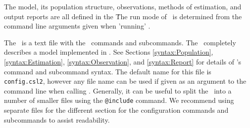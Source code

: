 The model, its population structure, observations, methods of estimation, and output reports are all defined in the \config\. The run mode of \CNAME\ is determined from the command line arguments given when 'running' \CNAME. 

The \config\ is a text file with the \CNAME\ commands and subcommands. The \config\ completely describes a model implemented in \CNAME. See Sections \ref{syntax:Population}, \ref{syntax:Estimation}, \ref{syntax:Observation}, and \ref{syntax:Report} for details of \CNAME's command and subcommand syntax.  The default name for this file is \texttt{config.csl2}, however any file name can be used if given as an argument to the command line when calling \CNAME. Generally, it can be useful to split the \config\ into a number of smaller files using the \texttt{@include} command. We recommend using separate files for the different section for the configuration commands and subcommands to assist readability.
